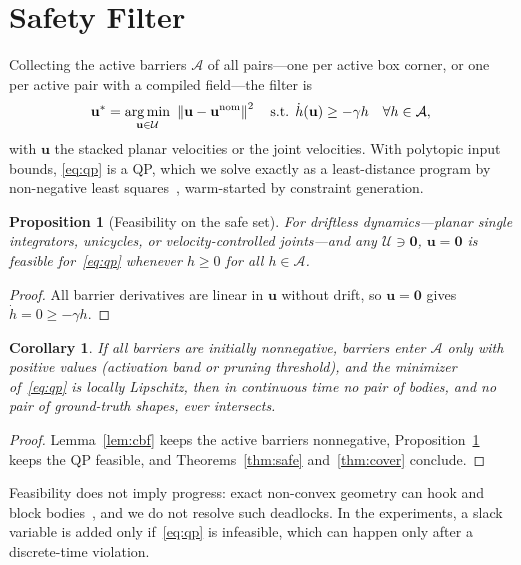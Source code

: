 \documentclass[journal]{IEEEtran}
\newtheorem{proposition}{Proposition}
\newtheorem{corollary}{Corollary}
\theoremstyle{definition}
\newcommand{\norm}[1]{\left\lVert #1\right\rVert}
\DeclareMathOperator*{\argmin}{arg\,min}
\begin{document}
\section{Safety Filter}\label{sec:filter}
Collecting the active barriers $\mathcal A$ of all pairs---one per active box corner, or one per active
pair with a compiled field---the filter is
\begin{equation}\label{eq:qp}
\mathbf u^\ast=\argmin_{\mathbf u\in\mathcal U}\ \norm{\mathbf u-\mathbf u^{\rm nom}}^2
\quad\text{s.t. }\dot h(\mathbf u)\ge-\gamma h\quad\forall h\in\mathcal A,
\end{equation}
with $\mathbf u$ the stacked planar velocities or the joint velocities. With polytopic input bounds,
\eqref{eq:qp} is a QP, which we solve exactly as a least-distance program by non-negative least
squares~\cite{lawson1995solving}, warm-started by constraint generation.
\begin{proposition}[Feasibility on the safe set]\label{prop:feas}
For driftless dynamics---planar single integrators, unicycles, or velocity-controlled joints---and
any $\mathcal U\ni\mathbf 0$, $\mathbf u=\mathbf 0$ is feasible for~\eqref{eq:qp} whenever
$h\ge0$ for all $h\in\mathcal A$.
\end{proposition}
\begin{proof}
All barrier derivatives are linear in $\mathbf u$ without drift, so $\mathbf u=\mathbf 0$ gives
$\dot h=0\ge-\gamma h$.
\end{proof}
\begin{corollary}\label{cor:closed}
If all barriers are initially nonnegative, barriers enter $\mathcal A$ only with positive values
(activation band or pruning threshold), and the minimizer of~\eqref{eq:qp} is locally Lipschitz,
then in continuous time no pair of bodies, and no pair of ground-truth shapes, ever intersects.
\end{corollary}
\begin{proof}
Lemma~\ref{lem:cbf} keeps the active barriers nonnegative, Proposition~\ref{prop:feas} keeps the QP
feasible, and Theorems~\ref{thm:safe} and~\ref{thm:cover} conclude.
\end{proof}
Feasibility does not imply progress: exact non-convex geometry can hook and block
bodies~\cite{reis2020undesirable}, and we do not resolve such deadlocks. In the experiments, a slack
variable is added only if~\eqref{eq:qp} is infeasible, which can happen only after a discrete-time
violation.

\end{document}
